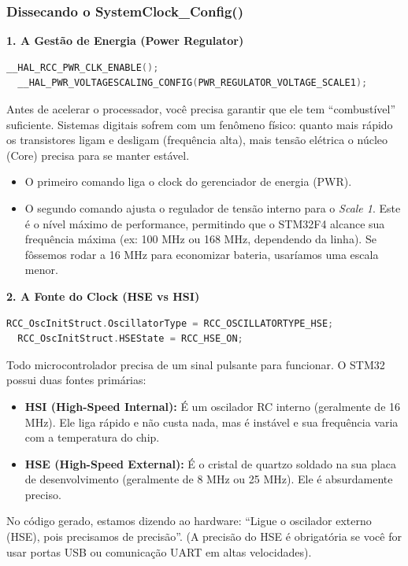 \documentclass[12pt,a4paper]{article}
\begin{document}
\subsubsection{Dissecando o SystemClock\_Config()}

\vspace{0.3cm}
\noindent\textbf{1. A Gestão de Energia (Power Regulator)}
\begin{lstlisting}[language=C]
  __HAL_RCC_PWR_CLK_ENABLE();
  __HAL_PWR_VOLTAGESCALING_CONFIG(PWR_REGULATOR_VOLTAGE_SCALE1);
\end{lstlisting}
Antes de acelerar o processador, você precisa garantir que ele tem ``combustível'' suficiente. Sistemas digitais sofrem com um fenômeno físico: quanto mais rápido os transistores ligam e desligam (frequência alta), mais tensão elétrica o núcleo (Core) precisa para se manter estável.
\begin{itemize}
    \item O primeiro comando liga o clock do gerenciador de energia (PWR).
    \item O segundo comando ajusta o regulador de tensão interno para o \textit{Scale 1}. Este é o nível máximo de performance, permitindo que o STM32F4 alcance sua frequência máxima (ex: 100 MHz ou 168 MHz, dependendo da linha). Se fôssemos rodar a 16 MHz para economizar bateria, usaríamos uma escala menor.
\end{itemize}

\vspace{0.3cm}
\noindent\textbf{2. A Fonte do Clock (HSE vs HSI)}
\begin{lstlisting}[language=C]
  RCC_OscInitStruct.OscillatorType = RCC_OSCILLATORTYPE_HSE;
  RCC_OscInitStruct.HSEState = RCC_HSE_ON;
\end{lstlisting}
Todo microcontrolador precisa de um sinal pulsante para funcionar. O STM32 possui duas fontes primárias:
\begin{itemize}
    \item \textbf{HSI (High-Speed Internal):} É um oscilador RC interno (geralmente de 16 MHz). Ele liga rápido e não custa nada, mas é instável e sua frequência varia com a temperatura do chip.
    \item \textbf{HSE (High-Speed External):} É o cristal de quartzo soldado na sua placa de desenvolvimento (geralmente de 8 MHz ou 25 MHz). Ele é absurdamente preciso.
\end{itemize}
No código gerado, estamos dizendo ao hardware: ``Ligue o oscilador externo (HSE), pois precisamos de precisão''. (A precisão do HSE é obrigatória se você for usar portas USB ou comunicação UART em altas velocidades).
\end{document}
